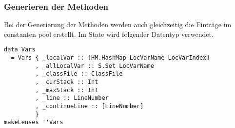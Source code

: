 \begin{frame}[fragile]
        \frametitle{Generieren der Methoden}
        Bei der Generierung der Methoden werden auch gleichzeitig die Einträge im constanten pool erstellt.  Im State wird folgender Datentyp verwendet.
        \begin{lstlisting}
data Vars
  = Vars { _localVar :: [HM.HashMap LocVarName LocVarIndex]
         , _allLocalVar :: S.Set LocVarName
         , _classFile :: ClassFile
         , _curStack :: Int
         , _maxStack :: Int
         , _line :: LineNumber
         , _continueLine :: [LineNumber]
         }
makeLenses ''Vars
        \end{lstlisting}
\end{frame}

